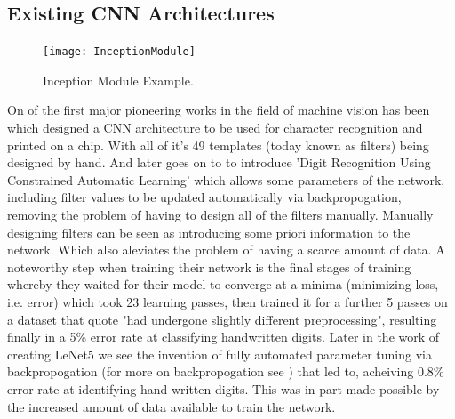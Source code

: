   \subsection{Existing CNN Architectures}
  \par
  \begin{figure}
    \centering
    \texttt{[image: InceptionModule]}
    \caption{\label{fig:InceptionModule}Inception Module Example.}
  \end{figure}
  On of the first major pioneering works in the field of machine vision has been \cite{Cun1989} which designed a CNN architecture to be used for character recognition and printed on a chip. With all of it's 49 templates (today known as filters) being designed by hand. And later goes on to to introduce 'Digit Recognition Using Constrained Automatic Learning' which allows some parameters of the network, including filter values to be updated automatically via backpropogation, removing the problem of having to design all of the filters manually. Manually designing filters can be seen as introducing some priori information to the network. Which also aleviates the problem of having a scarce amount of data. A noteworthy step when training their network is the final stages of training whereby they waited for their model to converge at a minima (minimizing loss, i.e. error) which took 23 learning passes, then trained it for a further 5 passes on a dataset that quote "had undergone slightly different preprocessing", resulting finally in a 5\% error rate at classifying handwritten digits. Later in the work of creating LeNet5 \cite{LeCun1998} we see the invention of fully automated parameter tuning via backpropogation (for more on backpropogation see \cite{CunYannle1988}) that led to, acheiving 0.8\% error rate at identifying hand written digits. This was in part made possible by the increased amount of data available to train the network.
  \par
